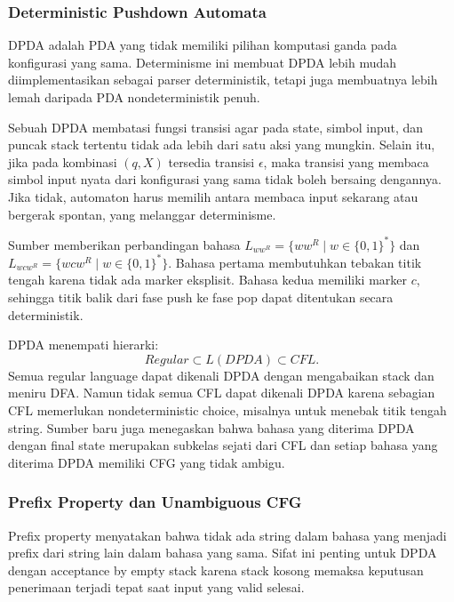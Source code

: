 \subsubsection{Deterministic Pushdown Automata}

\begin{jawab}
DPDA adalah PDA yang tidak memiliki pilihan komputasi ganda pada konfigurasi yang sama. Determinisme ini membuat DPDA lebih mudah diimplementasikan sebagai parser deterministik, tetapi juga membuatnya lebih lemah daripada PDA nondeterministik penuh.
\end{jawab}

Sebuah DPDA membatasi fungsi transisi agar pada state, simbol input, dan puncak stack tertentu tidak ada lebih dari satu aksi yang mungkin. Selain itu, jika pada kombinasi $(q,X)$ tersedia transisi $\epsilon$, maka transisi yang membaca simbol input nyata dari konfigurasi yang sama tidak boleh bersaing dengannya. Jika tidak, automaton harus memilih antara membaca input sekarang atau bergerak spontan, yang melanggar determinisme.

Sumber memberikan perbandingan bahasa $L_{ww^R}=\{ww^R\mid w\in\{0,1\}^*\}$ dan $L_{wcw^R}=\{wcw^R\mid w\in\{0,1\}^*\}$. Bahasa pertama membutuhkan tebakan titik tengah karena tidak ada marker eksplisit. Bahasa kedua memiliki marker $c$, sehingga titik balik dari fase push ke fase pop dapat ditentukan secara deterministik.

DPDA menempati hierarki:
\[
    Regular \subset L(DPDA) \subset CFL.
\]
Semua regular language dapat dikenali DPDA dengan mengabaikan stack dan meniru DFA. Namun tidak semua CFL dapat dikenali DPDA karena sebagian CFL memerlukan nondeterministic choice, misalnya untuk menebak titik tengah string. Sumber baru juga menegaskan bahwa bahasa yang diterima DPDA dengan final state merupakan subkelas sejati dari CFL dan setiap bahasa yang diterima DPDA memiliki CFG yang tidak ambigu.

\subsubsection{Prefix Property dan Unambiguous CFG}

\begin{jawab}
Prefix property menyatakan bahwa tidak ada string dalam bahasa yang menjadi prefix dari string lain dalam bahasa yang sama. Sifat ini penting untuk DPDA dengan acceptance by empty stack karena stack kosong memaksa keputusan penerimaan terjadi tepat saat input yang valid selesai.
\end{jawab}

